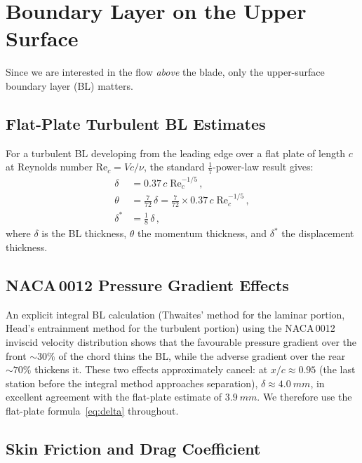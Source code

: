 \documentclass[11pt,a4paper]{article}
\begin{document}
\section{Boundary Layer on the Upper Surface}
\label{sec:BL}

Since we are interested in the flow \emph{above} the blade, only the
upper-surface boundary layer (BL) matters.

\subsection{Flat-Plate Turbulent BL Estimates}

For a turbulent BL developing from the leading edge over a flat plate
of length $c$ at Reynolds number $\mathrm{Re}_c = V c / \nu$, the
standard $\tfrac{1}{7}$-power-law result gives:
\begin{align}
  \delta &= 0.37\,c\;\mathrm{Re}_c^{-1/5}\,,
    \label{eq:delta} \\
  \theta &= \frac{7}{72}\,\delta
          = \frac{7}{72}\times 0.37\,c\;\mathrm{Re}_c^{-1/5}\,,
    \label{eq:theta} \\
  \delta^* &= \frac{1}{8}\,\delta\,,
    \label{eq:dstar}
\end{align}
where $\delta$ is the BL thickness, $\theta$ the momentum thickness,
and $\delta^*$ the displacement thickness.

\subsection{NACA\,0012 Pressure Gradient Effects}

An explicit integral BL calculation (Thwaites' method for the laminar
portion, Head's entrainment method for the turbulent portion) using the
NACA\,0012 inviscid velocity distribution shows that the favourable
pressure gradient over the front $\sim 30\%$ of the chord thins the BL,
while the adverse gradient over the rear $\sim 70\%$ thickens it. These
two effects approximately cancel: at $x/c \approx 0.95$ (the last
station before the integral method approaches separation),
$\delta \approx \SI{4.0}{mm}$, in excellent agreement with the
flat-plate estimate of $\SI{3.9}{mm}$. We therefore use the flat-plate
formula~\eqref{eq:delta} throughout.

\subsection{Skin Friction and Drag Coefficient}
\end{document}

